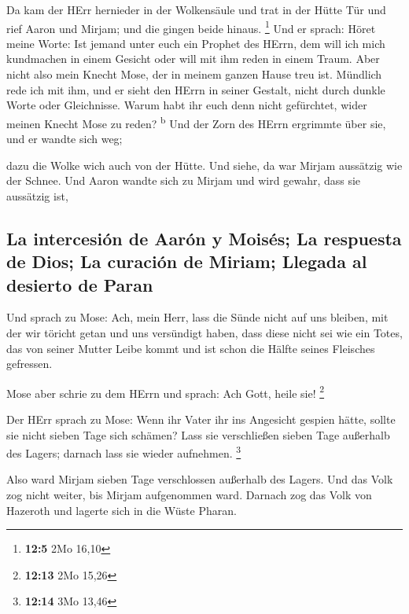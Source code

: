  Da kam der HErr hernieder in der Wolkensäule und trat in
der Hütte Tür und rief Aaron und Mirjam; und die gingen beide hinaus.
\footnote{\textbf{12:5} 2Mo 16,10}  Und er sprach: Höret
meine Worte: Ist jemand unter euch ein Prophet des HErrn, dem will ich
mich kundmachen in einem Gesicht oder will mit ihm reden in einem Traum.
 Aber nicht also mein Knecht Mose, der in meinem ganzen
Hause treu ist.  Mündlich rede ich mit ihm, und er sieht
den HErrn in seiner Gestalt, nicht durch dunkle Worte oder Gleichnisse.
Warum habt ihr euch denn nicht gefürchtet, wider meinen Knecht Mose zu
reden? \textsuperscript{b}  Und der Zorn des HErrn
ergrimmte über sie, und er wandte sich weg;

 dazu die Wolke wich auch von der Hütte. Und siehe, da
war Mirjam aussätzig wie der Schnee. Und Aaron wandte sich zu Mirjam und
wird gewahr, dass sie aussätzig ist,

\hypertarget{la-intercesiuxf3n-de-aaruxf3n-y-moisuxe9s-la-respuesta-de-dios-la-curaciuxf3n-de-miriam-llegada-al-desierto-de-paran}{%
\subsection{La intercesión de Aarón y Moisés; La respuesta de Dios; La
curación de Miriam; Llegada al desierto de
Paran}\label{la-intercesiuxf3n-de-aaruxf3n-y-moisuxe9s-la-respuesta-de-dios-la-curaciuxf3n-de-miriam-llegada-al-desierto-de-paran}}

 Und sprach zu Mose: Ach, mein Herr, lass die Sünde nicht
auf uns bleiben, mit der wir töricht getan und uns versündigt haben,
 dass diese nicht sei wie ein Totes, das von seiner
Mutter Leibe kommt und ist schon die Hälfte seines Fleisches gefressen.

 Mose aber schrie zu dem HErrn und sprach: Ach Gott,
heile sie! \footnote{\textbf{12:13} 2Mo 15,26}

 Der HErr sprach zu Mose: Wenn ihr Vater ihr ins
Angesicht gespien hätte, sollte sie nicht sieben Tage sich schämen? Lass
sie verschließen sieben Tage außerhalb des Lagers; darnach lass sie
wieder aufnehmen. \footnote{\textbf{12:14} 3Mo 13,46}

 Also ward Mirjam sieben Tage verschlossen außerhalb des
Lagers. Und das Volk zog nicht weiter, bis Mirjam aufgenommen ward.
 Darnach zog das Volk von Hazeroth und lagerte sich in
die Wüste Pharan.

